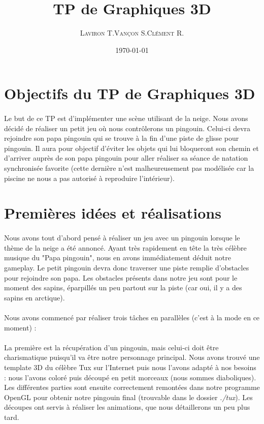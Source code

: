 \documentclass[11pt]{article}
\title{\textbf{TP de Graphiques 3D}}
\author{
  \begin{tabular}{ccc}
    \textsc{Laviron T.} & \textsc{Vançon S.} & \textsc{Clément R.}\\
\end{tabular}}
\date{\small \today}
\begin{document}
    \maketitle

    \section*{\bf Objectifs du TP de Graphiques 3D}
    \paragraph{}
    Le but de ce TP est d'implémenter une scène utilisant de la neige.
    Nous avons décidé de réaliser un petit jeu où nous contrôlerons un pingouin.
    Celui-ci devra rejoindre son papa pingouin qui se trouve à la fin d'une piste de glisse pour pingouin.
    Il aura pour objectif  d'éviter les objets qui lui bloqueront son chemin et d'arriver auprès de son papa pingouin pour aller réaliser
    sa séance de natation synchronisée favorite (cette dernière n'est malheureusement pas modélisée car la piscine ne
    nous a pas autorisé à reproduire l'intérieur).

    \section{Premières idées et réalisations}

    \paragraph{}
    Nous avons tout d'abord pensé à réaliser un jeu avec un pingouin lorsque le thème de la neige a été annoncé.
    Ayant très rapidement en tête la très célèbre musique du "Papa pingouin", nous en avons immédiatement déduit notre gameplay.
    Le petit pingouin devra donc traverser une piste remplie d'obstacles pour rejoindre son papa.
    Les obstacles présents dans notre jeu sont pour le moment des sapins, éparpillés un peu partout sur la piste (car oui, il y a des sapins en arctique).

    \paragraph{}
    Nous avons commencé par réaliser trois tâches en parallèles (c'est à la mode en ce moment) :

    \paragraph{}
    La première est la récupération d'un pingouin, mais celui-ci doit être charismatique puisqu'il va être notre personnage principal.
    Nous avons trouvé une template 3D du célèbre Tux sur l'Internet puis nous l'avons adapté à nos besoins : nous l'avons coloré puis découpé en petit morceaux (nous sommes diaboliques).
    Les différentes parties sont ensuite correctement remontées dans notre programme OpenGL pour obtenir notre pingouin final (trouvable dans le dossier \textit{./tux}).
    Les découpes ont servis à réaliser les animations, que nous détaillerons un peu plus tard.
\end{document}
